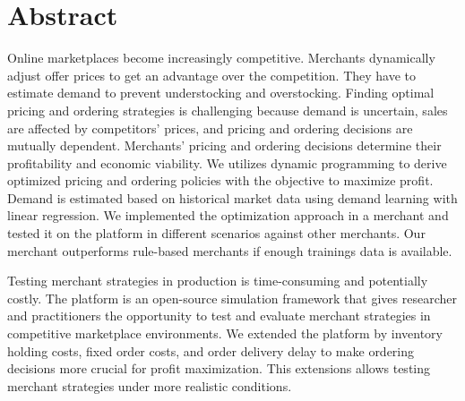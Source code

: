 \chapter*{Abstract}
Online marketplaces become increasingly competitive.
Merchants dynamically adjust offer prices to get an advantage over the competition.
They have to estimate demand to prevent understocking and overstocking.
Finding optimal pricing and ordering strategies is challenging because demand is uncertain, sales are affected by competitors' prices, and pricing and ordering decisions are mutually dependent.
Merchants' pricing and ordering decisions determine their profitability and economic viability.
We utilizes dynamic programming to derive optimized pricing and ordering policies with the objective to maximize profit.
Demand is estimated based on historical market data using demand learning with linear regression.
We implemented the optimization approach in a merchant and tested it on the \pricewars platform in different scenarios against other merchants.
Our merchant outperforms rule-based merchants if enough trainings data is available.

Testing merchant strategies in production is time-consuming and potentially costly.
The \pricewars platform is an open-source simulation framework that gives researcher and practitioners the opportunity to test and evaluate merchant strategies in competitive marketplace environments.
We extended the platform by inventory holding costs, fixed order costs, and order delivery delay to make ordering decisions more crucial for profit maximization.
This extensions allows testing merchant strategies under more realistic conditions.